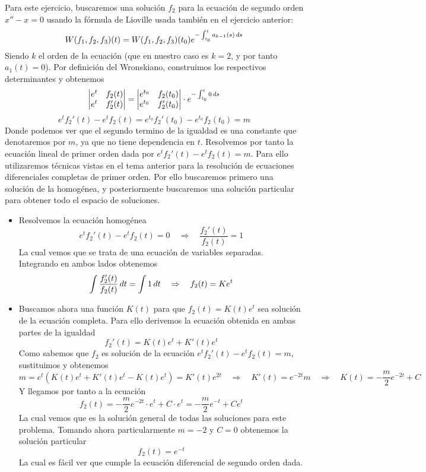 \documentclass[fleqn]{article}
\begin{document}
    Para este ejercicio, buscaremos una solución $f_2$ para la ecuación de segundo orden $x''-x=0$ usando la fórmula de Lioville usada también en el ejercicio anterior:
    $$W(f_1,f_2,f_3)(t) = W(f_1,f_2,f_3)(t_0) e^{-\int_{t_0}^t a_{k-1}(s)\thinspace ds}$$
    Siendo $k$ el orden de la ecuación (que en nuestro caso es $k=2$, y por tanto $a_1(t)=0$). Por definición del Wronskiano, construimos los respectivos determinantes y obtenemos
    $$
        \left|
        \begin{matrix}
            e^t & f_2(t) \\
            e^t & f_2'(t)
        \end{matrix}
        \right| = 
        \left|
        \begin{matrix}
            e^{t_0} & f_2(t_0) \\
            e^{t_0} & f_2'(t_0)
        \end{matrix}
        \right|
        \cdot e^{-\int_{t_0}^t 0\thinspace ds}
    $$   
    $$e^tf_2'(t) - e^tf_2(t) = e^{t_0} f_2'(t_0) - e^{t_0} f_2(t_0) = m$$
    Donde podemos ver que el segundo termino de la igualdad es una constante que denotaremos por $m$, ya que no tiene dependencia en $t$. Resolvemos por tanto la ecuación lineal 
    de primer orden dada por $e^tf_2'(t) - e^tf_2(t) = m$. Para ello utilizaremos técnicas vistas en el tema anterior para la resolución de ecuaciones diferenciales completas de primer orden.
    Por ello buscaremos primero una solución de la homogénea, y posteriormente buscaremos una solución particular para obtener todo el espacio de soluciones.
    \begin{itemize}
        \item Resolvemos la ecuación homogénea 
                $$e^tf_2'(t) - e^tf_2(t) = 0 \quad \Rightarrow \quad \frac{f_2'(t)}{f_2(t)}=1$$
                La cual vemos que se trata de una ecuación de variables separadas. Integrando en ambos lados obtenemos
                $$\int \frac{f_2'(t)}{f_2(t)} \thinspace dt = \int 1 \thinspace dt \quad \Rightarrow \quad f_2(t) = Ke^t$$
        \item Buscamos ahora una función $K(t)$ para que $f_2(t) = K(t)e^t$ sea solución de la ecuación completa. Para ello derivemos la ecuación obtenida en ambas partes de la igualdad
                $$f_2'(t) = K(t)e^t +K'(t)e^t$$
                Como sabemos que $f_2$ es solución de la ecuación $e^tf_2'(t) - e^tf_2(t) = m$, sustituimos y obtenemos
                $$m = e^t \left(K(t)e^t + K'(t)e^t - K(t)e^t \right) = K'(t)e^{2t} \quad \Rightarrow \quad K'(t)=e^{-2t}m \quad \Rightarrow \quad K(t)=-\frac{m}{2}e^{-2t} + C$$
                Y llegamos por tanto a la ecuación
                $$f_2(t) = -\frac{m}{2}e^{-2t}\cdot e^t + C\cdot e^t = -\frac{m}{2}e^{-t} + C e^t$$
                La cual vemos que es la solución general de todas las soluciones para este problema. Tomando ahora particularmente $m=-2$ y $C=0$ obtenemos la solución particular 
                $$f_2(t)=e^{-t}$$
                La cual es fácil ver que cumple la ecuación diferencial de segundo orden dada.\\ \\
    \end{itemize}
\end{document}
